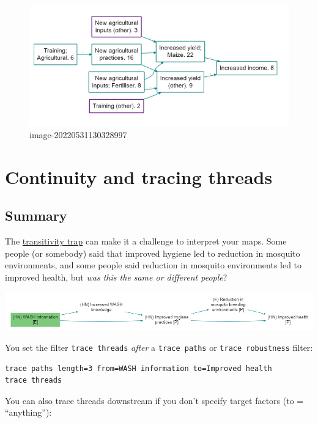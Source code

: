 \documentclass[
]{book}
\begin{document}
\begin{figure}
\centering
\includegraphics{_assets/image-20220531130328997.png}
\caption{image-20220531130328997}
\end{figure}

\hypertarget{xcontinuity}{%
\chapter{Continuity and tracing threads}\label{xcontinuity}}

\hypertarget{summary-7}{%
\section{Summary}\label{summary-7}}

The \protect\hyperlink{xtransitivity-trap}{transitivity trap} can make it a challenge to interpret your maps. Some people (or somebody) said that improved hygiene led to reduction in mosquito environments, and some people said reduction in mosquito environments led to improved health, but \emph{was this the same or different people}?

\includegraphics{_assets/image-20211215081735743.png}

You set the filter \texttt{trace\ threads} \emph{after} a \texttt{trace\ paths} or \texttt{trace\ robustness} filter:

\begin{verbatim}
trace paths length=3 from=WASH information to=Improved health
trace threads
\end{verbatim}

You can also trace threads downstream if you don't specify target factors (to = ``anything''):
\end{document}

